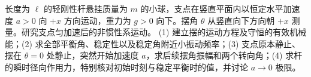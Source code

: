 长度为 \(\ell\) 的轻刚性杆悬挂质量为 \(m\) 的小球，支点在竖直平面内以恒定水平加速度 \(a>0\) 向 \(+x\) 方向运动，重力为 \(g>0\) 向下。摆角 \(\theta\) 从竖直向下方向朝 \(+x\) 测量。研究支点匀加速后的非惯性系运动。
(1) 建立摆的运动方程及守恒的有效机械能；(2) 求全部平衡角、稳定性以及稳定角附近小振动频率；(3) 支点原本静止、摆在 \(\theta=0\) 处静止，突然开始加速度 \(a\)，求后续摆角振幅和两个转向角；(4) 求杆的瞬时径向作用力，特别核对初始时刻与稳定平衡时的值，并讨论 \(a\to0\) 极限。
